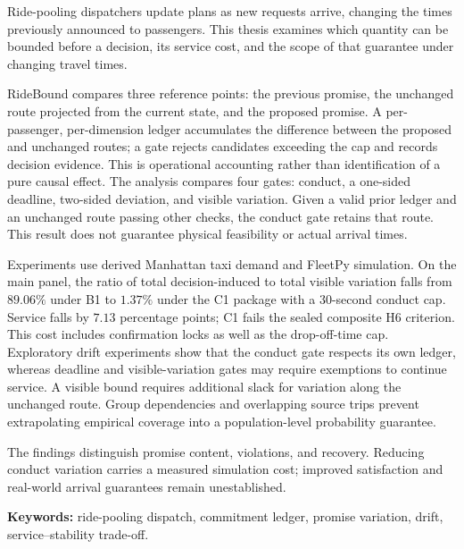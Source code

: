 Ride-pooling dispatchers update plans as new requests arrive, changing the times
previously announced to passengers. This thesis examines which quantity can be bounded
before a decision, its service cost, and the scope of that guarantee under changing
travel times.

RideBound compares three reference points: the previous promise, the unchanged route
projected from the current state, and the proposed promise. A per-passenger,
per-dimension ledger accumulates the difference between the proposed and unchanged
routes; a gate rejects candidates exceeding the cap and records decision evidence.
This is operational accounting rather than identification of a pure causal effect.
The analysis compares four gates: conduct, a one-sided deadline, two-sided deviation,
and visible variation. Given a valid prior ledger and an unchanged route passing other
checks, the conduct gate retains that route. This result does not guarantee physical
feasibility or actual arrival times.

Experiments use derived Manhattan taxi demand and FleetPy simulation. On the main panel,
the ratio of total decision-induced to total visible variation falls from $89.06\%$
under B1 to $1.37\%$ under the C1 package with a 30-second conduct cap. Service falls
by $7.13$ percentage points; C1 fails the sealed composite H6 criterion. This cost
includes confirmation locks as well as the drop-off-time cap. Exploratory drift
experiments show that the conduct gate respects its own ledger, whereas deadline and
visible-variation gates may require exemptions to continue service. A visible bound
requires additional slack for variation along the unchanged route. Group dependencies
and overlapping source trips prevent extrapolating empirical coverage into a
population-level probability guarantee.

The findings distinguish promise content, violations, and recovery. Reducing conduct
variation carries a measured simulation cost; improved satisfaction and real-world
arrival guarantees remain unestablished.

\vspace{6pt}
\noindent\textbf{Keywords:} ride-pooling dispatch, commitment ledger, promise variation,
drift, service--stability trade-off.

\endgroup
\clearpage
